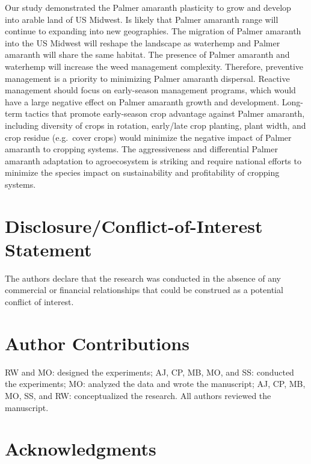 \documentclass[utf8]{frontiersSCNS}
\begin{document}
Our study demonstrated the Palmer amaranth plasticity to grow and
develop into arable land of US Midwest. Is likely that Palmer amaranth
range will continue to expanding into new geographies. The migration of
Palmer amaranth into the US Midwest will reshape the landscape as
waterhemp and Palmer amaranth will share the same habitat. The presence
of Palmer amaranth and waterhemp will increase the weed management
complexity. Therefore, preventive management is a priority to minimizing
Palmer amaranth dispersal. Reactive management should focus on
early-season management programs, which would have a large negative
effect on Palmer amaranth growth and development. Long-term tactics that
promote early-season crop advantage against Palmer amaranth, including
diversity of crops in rotation, early/late crop planting, plant width,
and crop residue (e.g.~cover crops) would minimize the negative impact
of Palmer amaranth to cropping systems. The aggressiveness and
differential Palmer amaranth adaptation to agroecosystem is striking and
require national efforts to minimize the species impact on
sustainability and profitability of cropping systems.

\hypertarget{disclosureconflict-of-interest-statement}{%
\section*{Disclosure/Conflict-of-Interest
Statement}\label{disclosureconflict-of-interest-statement}}

The authors declare that the research was conducted in the absence of
any commercial or financial relationships that could be construed as a
potential conflict of interest.

\hypertarget{author-contributions}{%
\section*{Author Contributions}\label{author-contributions}}

RW and MO: designed the experiments; AJ, CP, MB, MO, and SS: conducted
the experiments; MO: analyzed the data and wrote the manuscript; AJ, CP,
MB, MO, SS, and RW: conceptualized the research. All authors reviewed
the manuscript.

\hypertarget{acknowledgments}{%
\section*{Acknowledgments}\label{acknowledgments}}
\end{document}

